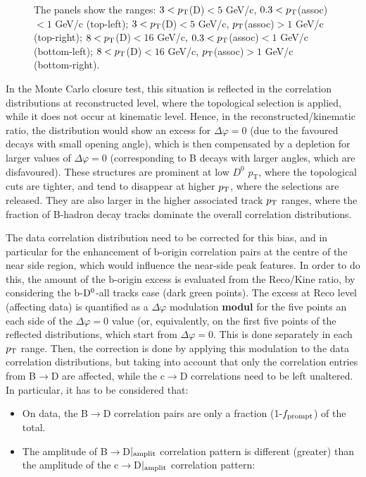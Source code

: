\begin{figure}
{The panels show the ranges: $3 < p_{\rm T}$(D)$ < 5$ GeV/c, $0.3 < p_{\rm T}$(assoc)$ < 1$ GeV/c (top-left); $3 < p_{\rm T}$(D)$ < 5$ GeV/c, $p_{\rm T}$(assoc)$ > 1$ GeV/c (top-right); $8 < p_{\rm T}$(D)$ < 16$ GeV/c, $0.3 < p_{\rm T}$(assoc)$ < 1$ GeV/c (bottom-left); $8 < p_{\rm T}$(D)$ < 16$ GeV/c, $p_{\rm T}$(assoc)$ > 1$ GeV/c (bottom-right).}
\label{fig:MC_Ratios}
\end{figure}

In the Monte Carlo closure test, this situation is reflected in the correlation distributions at reconstructed level, where the topological selection is applied, while it does not occur at kinematic level. Hence, in the reconstructed/kinematic ratio, the distribution would show an excess for $\Delta\varphi = 0$ (due to the favoured decays with small opening angle), which is then compensated by a depletion for larger values of $\Delta\varphi = 0$ (corresponding to B decays with larger angles, which are disfavoured).
These structures are prominent at low $D^0$ $p_\text{T}$, where the topological cuts are tighter, and tend to disappear at higher $p_{\rm T}$, where the selections are released. They are also larger in the higher associated track $p_{\rm T}$ ranges, where the fraction of B-hadron decay tracks dominate the overall correlation distributions.

The data correlation distribution need to be corrected for this bias, and in particular for the enhancement of b-origin correlation pairs at the centre of the near side region, which would influence the near-side peak features.
In order to do this, the amount of the b-origin excess is evaluated from the Reco/Kine ratio, by considering the b-${\rm D^0}$-all tracks case (dark green points). The excess at Reco level (affecting data) is quantified as a $\Delta\varphi$ modulation {\bf modul} for the five points an each side of the $\Delta\varphi = 0$ value (or, equivalently, on the first five points of the reflected distributions, which start from $\Delta\varphi=0$. This is done separately in each $p_{\rm T}$ range.
Then, the correction is done by applying this modulation to the data correlation distributions, but taking into account that only the correlation entries from B$\rightarrow$D are affected, while the c$\rightarrow$D correlations need to be left unaltered.
In particular, it has to be considered that:
\begin{itemize}
\item On data, the B$\rightarrow$D correlation pairs are only a fraction (1-$f_{\rm prompt}$) of the total.
\item The amplitude of B$\rightarrow$D$|_{\rm amplit}$ correlation pattern is different (greater) than the amplitude of the c$\rightarrow$D$|_{\rm amplit}$ correlation pattern:
\end{itemize}

